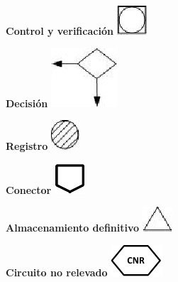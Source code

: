 \begin{center}
  \textbf{Control y verificación}
  \includegraphics{./Images/Simbolos/simbolo-Control-y-Verificacion.png}
\end{center}

\begin{center}
  \textbf{Decisión}
  \includegraphics{./Images/Simbolos/simbolo-Decision.png}
\end{center}


\begin{center}
  \textbf{Registro}
  \includegraphics{./Images/Simbolos/simbolo-Registro.png}
\end{center}

\begin{center}
  \textbf{Conector}
  \includegraphics{./Images/Simbolos/simbolo-Conector.png}
\end{center}

\begin{center}
  \textbf{Almacenamiento definitivo}
  \includegraphics{./Images/Simbolos/simbolo-Almacenamiento-Definitivo.png}
\end{center}

\begin{center}
  \textbf{Circuito no relevado}
  \includegraphics{./Images/Simbolos/simbolo-CNR.png}
\end{center}

